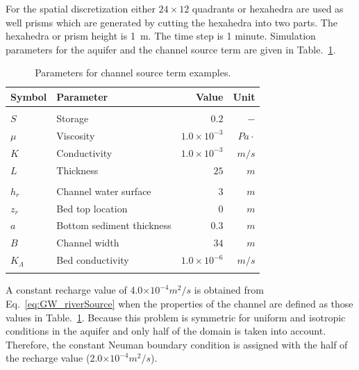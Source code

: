 For the spatial discretization either $24\times 12$ quadrants or hexahedra are used as well prisms which are generated by cutting the hexahedra into two parts. The hexahedra or prism height is 1~m. The time step is 1 minute.
Simulation parameters for the aquifer and the channel source term are given in Table.~\ref{GW_ChannelPercolation1}.
%
\begin{table}[H]
 \centering
 \caption{Parameters for channel source term examples.}
 \centering \label{GW_ChannelPercolation1}
\begin{tabular*}{0.9\textwidth}{@{\extracolsep{\fill}}llrr}
\hline\noalign{\smallskip}
Symbol& Parameter & Value & Unit\\ 
\hline\noalign{\smallskip}
\multicolumn{4}{c}{\bf Aquifer}		\\  
\hline\noalign{\smallskip}                             
		$S$ 	 	& 	  Storage 					             & $0.2$ & $-$ \\               
		$\mu$ 		& 	  Viscosity  				           & $1.0\times 10^{-3}$ & $Pa\cdot$\\ 
		$K$ 	 	& 	  Conductivity 				         & $1.0\times 10^{-3}$ & $m/s$ \\   
		$L$ 	 	& 	  Thickness 				            & $25$ & $m$ \\ 
\hline\noalign{\smallskip}          
\multicolumn{4}{c}{\bf Channel source term}				 	\\       
\hline\noalign{\smallskip}                             
		$h_r$ 		& 	  Channel water surface 	   & $3$ & $m$ \\                       
		$z_r$ 		& 	  Bed top location			       & $0$ & $m$ \\                       
		$a$ 	 	& 	  Bottom sediment thickness & $0.3$ & $m$ \\                     
		$B$ 	 	& 	  Channel width 			         & $34$ & $m$ \\                    
		$K_{\Lambda}$	 		& Bed conductivity 	  & $1.0\times 10^{-6}$ & $m/s$ \\
 \noalign{\smallskip}\hline
 \end{tabular*}
\end{table}
%
A constant recharge value of 4.0$ \times 10^{-4} m^2/s$ is obtained from Eq.~\ref{eq:GW_riverSource} when the properties
of the channel are defined as those values in Table.~\ref{GW_ChannelPercolation1}. Because this problem is
symmetric for uniform and isotropic conditions in the aquifer and only half of the domain
is taken into account. Therefore, the constant Neuman boundary condition is assigned with the half of
the recharge value (2.0$\times 10^{-4} m^2/s$).

